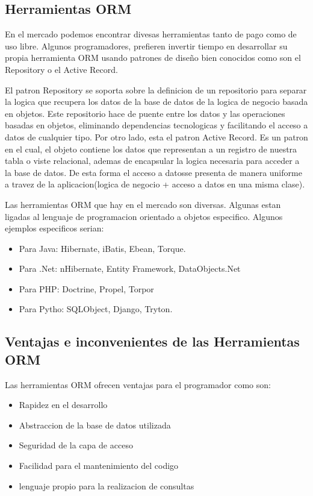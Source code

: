 \documentclass[twoside,twocolumn]{article}
\begin{document}
\subsection{Herramientas ORM}

En el mercado podemos encontrar divesas herramientas tanto de pago como de uso libre. Algunos programadores, 
prefieren invertir tiempo en desarrollar su propia herramienta ORM usando patrones de diseño bien conocidos como 
son el Repository o el Active Record.

El patron Repository se soporta sobre la definicion de un repositorio para separar la logica que recupera los datos de 
la base de datos de la logica de negocio basada en objetos. Este repositorio hace de puente entre los datos y las operaciones basadas
en objetos, eliminando dependencias tecnologicas y facilitando el acceso a datos de cualquier tipo.
Por otro lado, esta el patron Active Record. Es un patron en el cual, el objeto contiene los datos que representan a un registro de 
nuestra tabla o viste relacional, ademas de encapsular la logica necesaria para acceder a la base de datos. De esta forma el acceso a datosse presenta de manera uniforme a travez
de la aplicacion(logica de negocio + acceso a datos en una misma clase).

Las herramientas ORM que hay en el mercado son diversas. Algunas estan ligadas al lenguaje de programacion orientado a objetos especifico.
Algunos ejemplos especificos serian: 

\begin{itemize}
\item Para Java: Hibernate, iBatis, Ebean, Torque.
\item Para .Net: nHibernate, Entity Framework, DataObjects.Net
\item Para PHP: Doctrine, Propel, Torpor
\item Para Pytho: SQLObject, Django, Tryton.


\end{itemize}

\subsection{Ventajas e inconvenientes de las Herramientas ORM}

Las herramientas ORM ofrecen ventajas para el programador como son:
 \begin{itemize}
	 \item Rapidez en el desarrollo
	 \item Abstraccion de la base de datos utilizada
	 \item Seguridad de la capa de acceso
	 \item Facilidad para el mantenimiento del codigo
	 \item lenguaje propio para la realizacion de consultas
 \end{itemize}
\end{document}
